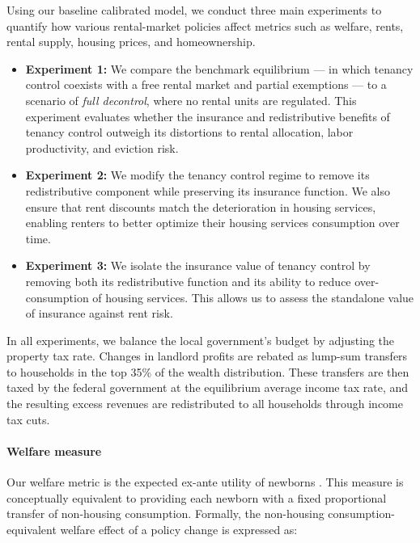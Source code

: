 \documentclass[parskip=full]{article}
\begin{document}
Using our baseline calibrated model, we conduct three main experiments to quantify how various rental-market policies affect metrics such as welfare, rents, rental supply, housing prices, and homeownership.

\begin{itemize}
    \item \textbf{Experiment 1:} We compare the benchmark equilibrium — in which tenancy control coexists with a free rental market and partial exemptions — to a scenario of \textit{full decontrol}, where no rental units are regulated. This experiment evaluates whether the insurance and redistributive benefits of tenancy control outweigh its distortions to rental allocation, labor productivity, and eviction risk.
    \item \textbf{Experiment 2:} We modify the tenancy control regime to remove its redistributive component while preserving its insurance function. We also ensure that rent discounts match the deterioration in housing services, enabling renters to better optimize their housing services consumption over time.
    \item \textbf{Experiment 3:} We isolate the insurance value of tenancy control by removing both its redistributive function and its ability to reduce over-consumption of housing services. This allows us to assess the standalone value of insurance against rent risk.
\end{itemize}

In all experiments, we balance the local government’s budget by adjusting the property tax rate. Changes in landlord profits are rebated as lump-sum transfers to households in the top 35\% of the wealth distribution. These transfers are then taxed by the federal government at the equilibrium average income tax rate, and the resulting excess revenues are redistributed to all households through income tax cuts.

\paragraph{Welfare measure} Our welfare metric is the expected ex-ante utility of newborns \citep{ralws-1971,conesa-et-al,gkkoc}. This measure is conceptually equivalent to providing each newborn with a fixed proportional transfer of non-housing consumption. Formally, the non-housing consumption-equivalent welfare effect of a policy change is expressed as:
\end{document}
